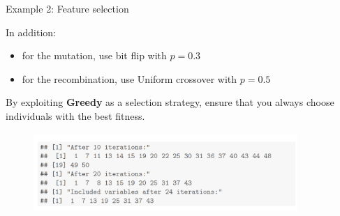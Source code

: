 \documentclass[11pt,compress,t,notes=noshow, xcolor=table]{beamer}
\begin{document}
\begin{vbframe}{Example 2: Feature selection}





In addition:

\begin{itemize}
\item for the mutation, use bit flip with $p = 0.3$
\item for the recombination, use Uniform crossover with $p=0.5$
\end{itemize}

\lz

By exploiting \textbf{Greedy} as a selection strategy, ensure that you always choose individuals with the best fitness. 








\vspace{0.5cm}
\begin{center}
\begin{figure}
  \includegraphics[height = 3cm, width = 10cm]{figure_man/example3.png}
\end{figure}
\end{center}





\end{vbframe}
\end{document}

